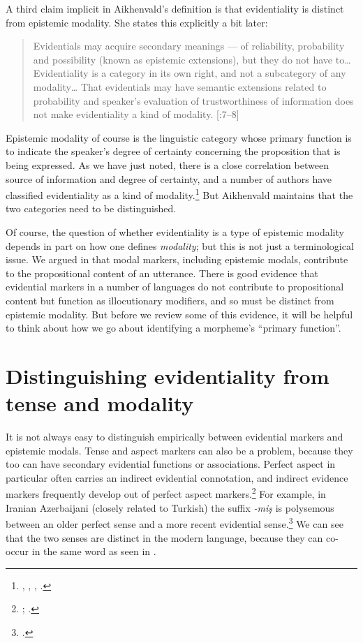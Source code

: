 A third claim implicit in Aikhenvald’s definition is that evidentiality is distinct from epistemic modality. She states this explicitly a bit later:


\begin{quote}
Evidentials may acquire secondary meanings — of reliability, probability and possibility (known as epistemic extensions), but they do not have to… Evidentiality is a category in its own right, and not a subcategory of any modality… That evidentials may have semantic extensions related to probability and speaker’s evaluation of trustworthiness of information does not make evidentiality a kind of modality. [\citealt{Aikhenvald2004}:7–8]
\end{quote}


Epistemic modality of course is the linguistic category whose primary function is to indicate the speaker’s degree of certainty concerning the proposition that is being expressed. As we have just noted, there is a close correlation between source of information and degree of certainty, and a number of authors have classified evidentiality as a kind of modality.\footnote{\citet{Palmer1986}, \citet{Frawley1992}, \citet{MatthewsonEtAl2007}, \citet{Izvorski1997}.} But Aikhenvald maintains that the two categories need to be distinguished. 



Of course, the question of whether evidentiality is a type of epistemic modality depends in part on how one defines \textit{modality}; but this is not just a terminological issue. We argued in  that modal markers, including epistemic modals, contribute to the propositional content of an utterance. There is good evidence that evidential markers in a number of languages do not contribute to propositional content but function as illocutionary modifiers, and so must be distinct from epistemic modality. But before we review some of this evidence, it will be helpful to think about how we go about identifying a morpheme’s “primary function”.


\section{Distinguishing evidentiality from tense and modality}\label{sec:} %

It is not always easy to distinguish empirically between evidential markers and epistemic modals. Tense and aspect markers can also be a problem, because they too can have secondary evidential functions or associations. Perfect aspect in particular often carries an indirect evidential connotation, and indirect evidence markers frequently develop out of perfect aspect markers.\footnote{\citet{Izvorski1997}; \citet{BybeeEtAl1994}.} For example, in Iranian Azerbaijani (closely related to Turkish) the suffix \textit{-miş} is polysemous between an older perfect sense and a more recent evidential sense.\footnote{\citet{Lee2008}.} We can see that the two senses are distinct in the modern language, because they can co-occur in the same word as seen in .


